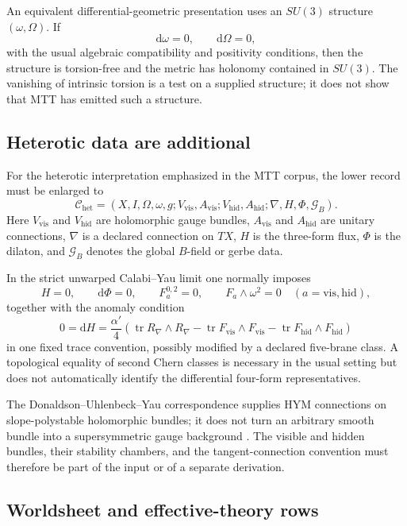 \documentclass[11pt]{article}
\theoremstyle{definition}
\theoremstyle{remark}
\newcommand{\dd}{\mathrm d}
\newcommand{\cC}{\mathcal C}
\newcommand{\cG}{\mathcal G}
\newcommand{\tr}{\operatorname{tr}}
\begin{document}
An equivalent differential-geometric presentation uses an \(SU(3)\)
structure \((\omega,\Omega)\).  If
\[
\dd\omega=0,\qquad \dd\Omega=0,
\]
with the usual algebraic compatibility and positivity conditions, then the
structure is torsion-free and the metric has holonomy contained in \(SU(3)\).
The vanishing of intrinsic torsion is a test on a supplied structure; it does
not show that MTT has emitted such a structure.

\subsection{Heterotic data are additional}

For the heterotic interpretation emphasized in the MTT corpus, the lower
record must be enlarged to
\[
\cC_{\mathrm{het}}=
(X,I,\Omega,\omega,g;
 V_{\mathrm{vis}},A_{\mathrm{vis}};
 V_{\mathrm{hid}},A_{\mathrm{hid}};
 \nabla,H,\Phi,\cG_B).
\]
Here \(V_{\mathrm{vis}}\) and \(V_{\mathrm{hid}}\) are holomorphic gauge
bundles, \(A_{\mathrm{vis}}\) and \(A_{\mathrm{hid}}\) are unitary
connections, \(\nabla\) is a declared connection on \(TX\), \(H\) is the
three-form flux, \(\Phi\) is the dilaton, and \(\cG_B\) denotes the global
\(B\)-field or gerbe data.

In the strict unwarped Calabi--Yau limit one normally imposes
\[
H=0,\qquad \dd\Phi=0,\qquad
F_a^{0,2}=0,\qquad F_a\wedge\omega^2=0
\quad(a=\mathrm{vis},\mathrm{hid}),
\]
together with the anomaly condition
\[
0=\dd H=\frac{\alpha'}4
\left(\tr R_\nabla\wedge R_\nabla
-\tr F_{\mathrm{vis}}\wedge F_{\mathrm{vis}}
-\tr F_{\mathrm{hid}}\wedge F_{\mathrm{hid}}\right)
\]
in one fixed trace convention, possibly modified by a declared five-brane
class.  A topological equality of second Chern classes is necessary in the
usual setting but does not automatically identify the differential
four-form representatives.

The Donaldson--Uhlenbeck--Yau correspondence supplies HYM connections on
slope-polystable holomorphic bundles; it does not turn an arbitrary smooth
bundle into a supersymmetric gauge background
\cite{Donaldson1985,UhlenbeckYau1986}.  The visible and hidden bundles, their
stability chambers, and the tangent-connection convention must therefore be
part of the input or of a separate derivation.

\subsection{Worldsheet and effective-theory rows}
\end{document}
